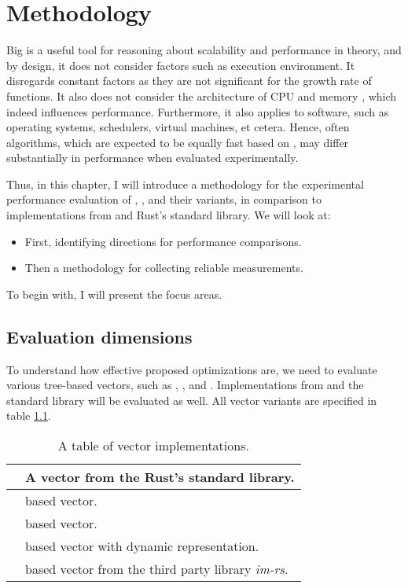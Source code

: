 \chapter{Methodology}
Big \bigochar{} is a useful tool for reasoning about scalability and performance in theory, and by design, it does not consider factors such as execution environment. It disregards constant factors as they are not significant for the growth rate of functions. It also does not consider the architecture of CPU and memory \cite{what-programmer-should-know-about-memory}, which indeed influences performance. Furthermore, it also applies to software, such as operating systems, schedulers, virtual machines, et cetera. Hence, often algorithms, which are expected to be equally fast based on \bigochar{}, may differ substantially in performance when evaluated experimentally.

Thus, in this chapter, I will introduce a methodology for the experimental performance evaluation of \rrbvec{}, \pvec{}, and their variants, in comparison to implementations from \imrsvec{} and Rust's standard library. We will look at:

\begin{itemize}
    \item First, identifying directions for performance comparisons.
    \item Then a methodology for collecting reliable measurements.
\end{itemize}

To begin with, I will present the focus areas.

\section{Evaluation dimensions}
To understand how effective proposed optimizations are, we need to evaluate various tree-based vectors, such as \rbvec{}, \rrbvec{}, and \pvec{}. Implementations from \imrsvec{} and the standard library will be evaluated as well. All vector variants are specified in table \ref{tab:vec-implementations}.

\begin{table}[!htbp]
    \centering

    \begin{tabular} { |l| p{11cm} | }
        \hline
        \stdvec{} & A vector from the Rust's standard library. \\ \hline
        \rbvec{} & \rbtree{} based vector. \\ \hline
        \rrbvec{} & \rrbtree{} based vector. \\ \hline
        \pvec{} & \rrbtree{} based vector with dynamic representation. \\ \hline
        \imrsvec{} & \rrbtree{} based vector from the third party library \emph{im-rs}\footnotemark{}. \\ \hline
    \end{tabular}

    \label{tab:vec-implementations}
    \caption{A table of vector implementations.}
\end{table}

